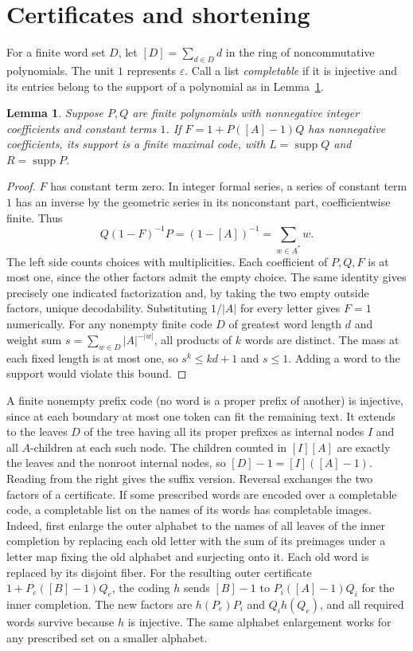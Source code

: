 \documentclass[11pt,a4paper]{article}
\newtheorem{lemma}{Lemma}
\newcommand{\eps}{\varepsilon}
\begin{document}
\section{Certificates and shortening}
For a finite word set $D$, let $[D]=\sum_{d\in D}d$ in the ring of noncommutative polynomials. The unit $1$ represents $\eps$. Call a list \emph{completable} if it is injective and its entries belong to the support of a polynomial as in Lemma~\ref{cert}.
\begin{lemma}\label{cert}
Suppose $P,Q$ are finite polynomials with nonnegative integer coefficients and constant terms $1$. If $F=1+P([A]-1)Q$ has nonnegative coefficients, its support is a finite maximal code, with $L=\operatorname{supp}Q$ and $R=\operatorname{supp}P$.
\end{lemma}
\begin{proof}
$F$ has constant term zero. In integer formal series, a series of constant term $1$ has an inverse by the geometric series in its nonconstant part, coefficientwise finite. Thus
\[
 Q(1-F)^{-1}P=(1-[A])^{-1}=\sum_{w\in A^*}w .
\]
The left side counts choices with multiplicities. Each coefficient of $P,Q,F$ is at most one, since the other factors admit the empty choice. The same identity gives precisely one indicated factorization and, by taking the two empty outside factors, unique decodability. Substituting $1/|A|$ for every letter gives $F=1$ numerically. For any nonempty finite code $D$ of greatest word length $d$ and weight sum $s=\sum_{w\in D}|A|^{-|w|}$, all products of $k$ words are distinct. The mass at each fixed length is at most one, so $s^k\le kd+1$ and $s\le1$. Adding a word to the support would violate this bound.
\end{proof}
A finite nonempty prefix code (no word is a proper prefix of another) is injective, since at each boundary at most one token can fit the remaining text. It extends to the leaves $D$ of the tree having all its proper prefixes as internal nodes $I$ and all $A$-children at each such node. The children counted in $[I][A]$ are exactly the leaves and the nonroot internal nodes, so $[D]-1=[I]([A]-1)$. Reading from the right gives the suffix version. Reversal exchanges the two factors of a certificate.
If some prescribed words are encoded over a completable code, a completable list on the names of its words has completable images. Indeed, first enlarge the outer alphabet to the names of all leaves of the inner completion by replacing each old letter with the sum of its preimages under a letter map fixing the old alphabet and surjecting onto it. Each old word is replaced by its disjoint fiber. For the resulting outer certificate $1+P_e([B]-1)Q_e$, the coding $h$ sends $[B]-1$ to $P_i([A]-1)Q_i$ for the inner completion. The new factors are $h(P_e)P_i$ and $Q_i h(Q_e)$, and all required words survive because $h$ is injective. The same alphabet enlargement works for any prescribed set on a smaller alphabet.
\end{document}
